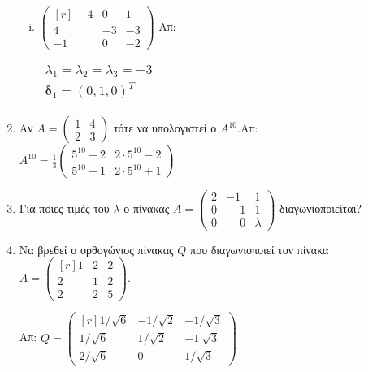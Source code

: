 \begin{enumerate}
\begin{enumerate}[i)]
\item $ \begin{pmatrix*}[r]
		-4 & 0  & 1 \\
		4 & -3 & -3 \\
		-1 & 0 & -2 
\end{pmatrix*}$ \hfill Απ: \begin{tabular}{l}
$ \lambda_{1} = \lambda_{2} = \lambda_{3} = -3 $ \\
$ \bm{\delta}_{1} = (0,1,0)^{T} $
\end{tabular}

\end{enumerate}

\item Αν $A=\begin{pmatrix}
1 & 4 \\
2 & 3 
\end{pmatrix}$ τότε να υπολογιστεί ο $A^{10}$.\hfill Απ: $A^{10}=\frac{1}{3}\begin{pmatrix}
5^{10}+2 & 2\cdot 5^{10}-2 \\
5^{10}-1 & 2\cdot 5^{10}+1
\end{pmatrix}$

\item Για ποιες τιμές του $\lambda$ ο πίνακας $A=\begin{pmatrix}
2 & -1 & 1 \\
0 & \phantom{-}1 & 1 \\
0 & \phantom{-}0 & \lambda
\end{pmatrix}$
διαγωνιοποιείται?

\item Να βρεθεί ο ορθογώνιος πίνακας $Q$ που διαγωνιοποιεί τον πίνακα
	$A = \begin{pmatrix*}[r]
		1 & 2 & 2 \\
		2 & 1 & 2 \\
		2 & 2 & 5 
	\end{pmatrix*}.$
	
	\hfill Απ: $ Q = \begin{pmatrix*}[r]
		1/ \sqrt{6} & -1/ \sqrt{2} & -1/ \sqrt{3}	\\
		1/ \sqrt{6} & 1/ \sqrt{2} & -1\ \sqrt{3} \\
		2/ \sqrt{6} & 0 & 1/ \sqrt{3} 
	\end{pmatrix*} $

\end{enumerate}





